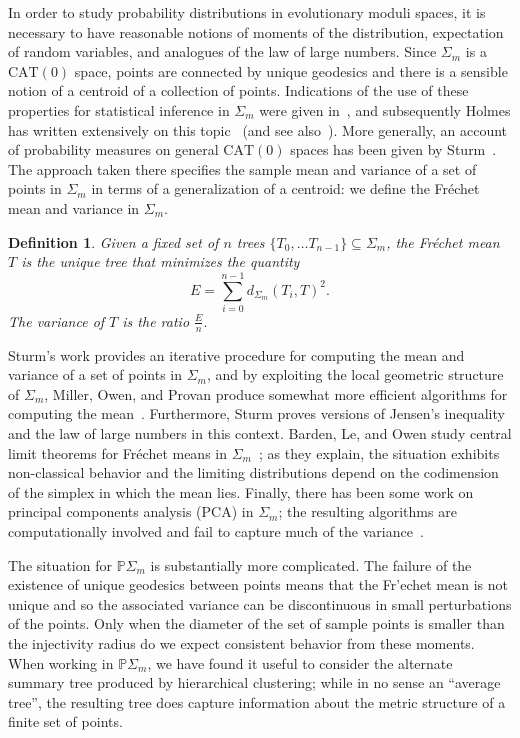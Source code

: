 \documentclass[a4paper,11pt]{article}
\newtheorem{definition}{Definition}
\newcommand{\CAT}{\textrm{CAT}}
\begin{document}
In order to study probability distributions in evolutionary moduli spaces, it is necessary to have reasonable notions of moments of the distribution, expectation of random variables, and analogues of the law of large numbers.
Since $\Sigma_m$ is a $\CAT(0)$ space, points are connected by unique geodesics and there is a sensible notion of a centroid of a collection of points.
Indications of the use of these properties for statistical inference in $\Sigma_m$ were given in~\cite{billera2001geometry}, and subsequently Holmes has written extensively on this topic~\cite{holmes2003bootstrapping, holmes2003bootstrapping, holmes2005statistical} (and see also~\cite{feragen2013tree}).
More generally, an account of probability measures on general $\CAT(0)$ spaces has been given by Sturm~\cite{sturm2003probability}.
The approach taken there specifies the sample mean and variance of a set of points in $\Sigma_m$ in terms of a generalization of a centroid: we define the Fr\'echet mean and variance in $\Sigma_m$.

\begin{definition}
Given a fixed set of $n$ trees $\{T_0, \ldots T_{n-1}\} \subseteq \Sigma_m$, the Fr\'echet mean $T$ is the unique tree that minimizes the quantity \[E = \sum_{i = 0}^{n-1} d_{\Sigma_m}(T_i, T)^2.\] 
The variance of $T$ is the ratio $\frac{E}{n}$.
\end{definition}

Sturm's work provides an iterative procedure for computing the mean and variance of a set of points in $\Sigma_m$, and by exploiting the local geometric structure of $\Sigma_m$, Miller, Owen, and Provan produce somewhat more efficient algorithms for computing the mean~\cite{miller2012polyhedral}.
Furthermore, Sturm proves versions of Jensen's inequality and the law of large numbers in this context.
Barden, Le, and Owen study central limit theorems for Fr\'echet means in $\Sigma_m$~\cite{barden2013mean}; as they explain, the situation exhibits non-classical behavior and the limiting distributions depend on the codimension of the simplex in which the mean lies.
Finally, there has been some work on principal components analysis (PCA) in $\Sigma_m$; the resulting algorithms are computationally involved and fail to capture much of the variance~\cite{Nye2011PCA}.

The situation for $\mathbb{P}\Sigma_m$ is substantially more complicated.
The failure of the existence of unique geodesics between points means that the Fr'echet mean is not unique and so the associated variance can be discontinuous in small perturbations of the points.
Only when the diameter of the set of sample points is smaller than the injectivity radius do we expect consistent behavior from these moments.
When working in $\mathbb{P}\Sigma_m$, we have found it useful to consider the alternate summary tree produced by hierarchical clustering; while in no sense an ``average tree'', the resulting tree does capture information about the metric structure of a finite set of points.
\end{document}
